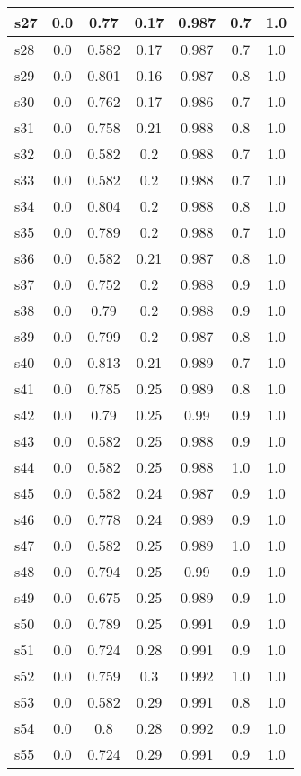 \documentclass{article}
\begin{document}
\begin{tabular}{|l|c|c|c|c|c|c|}
\hline
s27 &0.0 & 0.77 & 0.17 & 0.987 & 0.7 & 1.0\\
\hline
s28 &0.0 & 0.582 & 0.17 & 0.987 & 0.7 & 1.0\\
\hline
s29 &0.0 & 0.801 & 0.16 & 0.987 & 0.8 & 1.0\\
\hline
s30 &0.0 & 0.762 & 0.17 & 0.986 & 0.7 & 1.0\\
\hline
s31 &0.0 & 0.758 & 0.21 & 0.988 & 0.8 & 1.0\\
\hline
s32 &0.0 & 0.582 & 0.2 & 0.988 & 0.7 & 1.0\\
\hline
s33 &0.0 & 0.582 & 0.2 & 0.988 & 0.7 & 1.0\\
\hline
s34 &0.0 & 0.804 & 0.2 & 0.988 & 0.8 & 1.0\\
\hline
s35 &0.0 & 0.789 & 0.2 & 0.988 & 0.7 & 1.0\\
\hline
s36 &0.0 & 0.582 & 0.21 & 0.987 & 0.8 & 1.0\\
\hline
s37 &0.0 & 0.752 & 0.2 & 0.988 & 0.9 & 1.0\\
\hline
s38 &0.0 & 0.79 & 0.2 & 0.988 & 0.9 & 1.0\\
\hline
s39 &0.0 & 0.799 & 0.2 & 0.987 & 0.8 & 1.0\\
\hline
s40 &0.0 & 0.813 & 0.21 & 0.989 & 0.7 & 1.0\\
\hline
s41 &0.0 & 0.785 & 0.25 & 0.989 & 0.8 & 1.0\\
\hline
s42 &0.0 & 0.79 & 0.25 & 0.99 & 0.9 & 1.0\\
\hline
s43 &0.0 & 0.582 & 0.25 & 0.988 & 0.9 & 1.0\\
\hline
s44 &0.0 & 0.582 & 0.25 & 0.988 & 1.0 & 1.0\\
\hline
s45 &0.0 & 0.582 & 0.24 & 0.987 & 0.9 & 1.0\\
\hline
s46 &0.0 & 0.778 & 0.24 & 0.989 & 0.9 & 1.0\\
\hline
s47 &0.0 & 0.582 & 0.25 & 0.989 & 1.0 & 1.0\\
\hline
s48 &0.0 & 0.794 & 0.25 & 0.99 & 0.9 & 1.0\\
\hline
s49 &0.0 & 0.675 & 0.25 & 0.989 & 0.9 & 1.0\\
\hline
s50 &0.0 & 0.789 & 0.25 & 0.991 & 0.9 & 1.0\\
\hline
s51 &0.0 & 0.724 & 0.28 & 0.991 & 0.9 & 1.0\\
\hline
s52 &0.0 & 0.759 & 0.3 & 0.992 & 1.0 & 1.0\\
\hline
s53 &0.0 & 0.582 & 0.29 & 0.991 & 0.8 & 1.0\\
\hline
s54 &0.0 & 0.8 & 0.28 & 0.992 & 0.9 & 1.0\\
\hline
s55 &0.0 & 0.724 & 0.29 & 0.991 & 0.9 & 1.0\\

\end{tabular}
\end{document}
